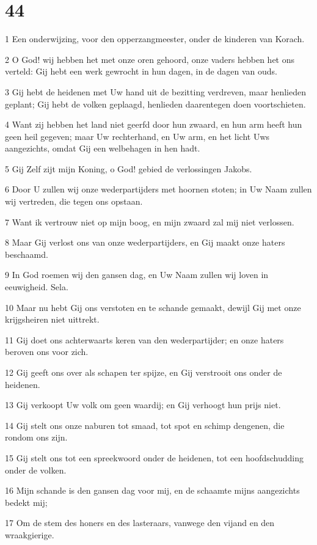 \chapter{44}

\par 1 Een onderwijzing, voor den opperzangmeester, onder de kinderen van Korach.
\par 2 O God! wij hebben het met onze oren gehoord, onze vaders hebben het ons verteld: Gij hebt een werk gewrocht in hun dagen, in de dagen van ouds.
\par 3 Gij hebt de heidenen met Uw hand uit de bezitting verdreven, maar henlieden geplant; Gij hebt de volken geplaagd, henlieden daarentegen doen voortschieten.
\par 4 Want zij hebben het land niet geerfd door hun zwaard, en hun arm heeft hun geen heil gegeven; maar Uw rechterhand, en Uw arm, en het licht Uws aangezichts, omdat Gij een welbehagen in hen hadt.
\par 5 Gij Zelf zijt mijn Koning, o God! gebied de verlossingen Jakobs.
\par 6 Door U zullen wij onze wederpartijders met hoornen stoten; in Uw Naam zullen wij vertreden, die tegen ons opstaan.
\par 7 Want ik vertrouw niet op mijn boog, en mijn zwaard zal mij niet verlossen.
\par 8 Maar Gij verlost ons van onze wederpartijders, en Gij maakt onze haters beschaamd.
\par 9 In God roemen wij den gansen dag, en Uw Naam zullen wij loven in eeuwigheid. Sela.
\par 10 Maar nu hebt Gij ons verstoten en te schande gemaakt, dewijl Gij met onze krijgsheiren niet uittrekt.
\par 11 Gij doet ons achterwaarts keren van den wederpartijder; en onze haters beroven ons voor zich.
\par 12 Gij geeft ons over als schapen ter spijze, en Gij verstrooit ons onder de heidenen.
\par 13 Gij verkoopt Uw volk om geen waardij; en Gij verhoogt hun prijs niet.
\par 14 Gij stelt ons onze naburen tot smaad, tot spot en schimp dengenen, die rondom ons zijn.
\par 15 Gij stelt ons tot een spreekwoord onder de heidenen, tot een hoofdschudding onder de volken.
\par 16 Mijn schande is den gansen dag voor mij, en de schaamte mijns aangezichts bedekt mij;
\par 17 Om de stem des honers en des lasteraars, vanwege den vijand en den wraakgierige.
